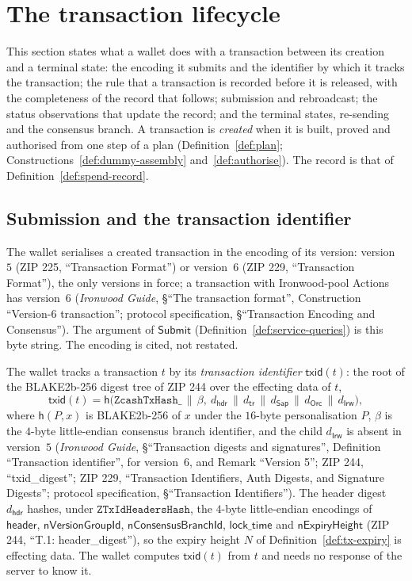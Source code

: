 \documentclass[11pt,a4paper]{article}
\theoremstyle{definition}
\begin{document}
\section{The transaction lifecycle}\label{sec:lifecycle}

This section states what a wallet does with a transaction between its
creation and a terminal state: the encoding it submits and the identifier by
which it tracks the transaction; the rule that a transaction is recorded
before it is released, with the completeness of the record that follows;
submission and rebroadcast; the status observations that update the record;
and the terminal states, re-sending and the consensus branch. A transaction
is \emph{created} when it is built, proved and authorised from one step of a
plan (Definition~\ref{def:plan}; Constructions~\ref{def:dummy-assembly}
and~\ref{def:authorise}). The record is that of
Definition~\ref{def:spend-record}.

\subsection{Submission and the transaction identifier}
\label{sec:life-submit}

The wallet serialises a created transaction in the encoding of its version:
version~$5$ (ZIP 225, ``Transaction Format'') or version~$6$ (ZIP 229,
``Transaction Format''), the only versions in force; a transaction with
Ironwood-pool Actions has version~$6$ (\emph{Ironwood Guide}, \S``The
transaction format'', Construction ``Version-6 transaction''; protocol
specification, \S``Transaction Encoding and Consensus''). The argument of
$\mathsf{Submit}$ (Definition~\ref{def:service-queries}) is this byte
string. The encoding is cited, not restated.

The wallet tracks a transaction $t$ by its \emph{transaction identifier}
$\mathsf{txid}(t)$: the root of the BLAKE2b-256 digest tree of ZIP 244 over
the effecting data of $t$,
\[
  \mathsf{txid}(t) = \mathsf{h}\bigl(\texttt{ZcashTxHash\_} \,\|\, \beta,\
    d_{\mathsf{hdr}} \,\|\, d_{\mathsf{tr}} \,\|\, d_{\mathsf{Sap}}
    \,\|\, d_{\mathsf{Orc}} \,\|\, d_{\mathsf{Irw}}\bigr),
\]
where $\mathsf{h}(P, x)$ is BLAKE2b-256 of $x$ under the $16$-byte
personalisation $P$, $\beta$ is the $4$-byte little-endian consensus branch
identifier, and the child $d_{\mathsf{Irw}}$ is absent in version~$5$
(\emph{Ironwood Guide}, \S``Transaction digests and signatures'', Definition
``Transaction identifier'', for version~$6$, and Remark ``Version 5''; ZIP 244,
``txid\_digest''; ZIP 229, ``Transaction Identifiers, Auth Digests, and
Signature Digests''; protocol specification, \S``Transaction Identifiers''). The
header digest $d_{\mathsf{hdr}}$ hashes, under $\texttt{ZTxIdHeadersHash}$, the
$4$-byte little-endian encodings of $\mathsf{header}$,
$\mathsf{nVersionGroupId}$, $\mathsf{nConsensusBranchId}$, $\mathsf{lock\_time}$
and $\mathsf{nExpiryHeight}$ (ZIP 244, ``T.1: header\_digest''), so the expiry
height $N$ of Definition~\ref{def:tx-expiry} is effecting data. The wallet
computes $\mathsf{txid}(t)$ from $t$ and needs no response of the server to know
it.
\end{document}
